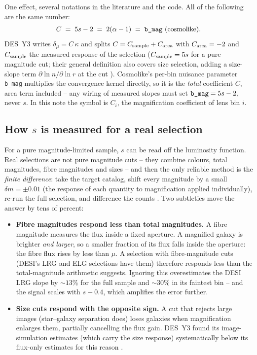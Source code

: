 \documentclass[11pt]{article}
\newcommand{\us}{\_\allowbreak}
\begin{document}
One effect, several notations in the literature and the code.  All of
the following are the same number:
\begin{equation}
  C \;=\; 5s - 2 \;=\; 2(\alpha - 1)
  \;=\; \texttt{b\us mag}\ \text{(cosmolike)} .
  \label{eq:conventions}
\end{equation}
DES~Y3 \cite{KrauseY3, ElvinPoole2022} writes
$\delta_\mu = C\,\kappa$ and splits $C = C_{\rm sample} + C_{\rm
area}$ with $C_{\rm area} = -2$ and $C_{\rm sample}$ the measured
response of the selection ($C_{\rm sample} = 5s$ for a pure magnitude
cut; their general definition also covers size selection, adding a
size-slope term $\partial\ln n/\partial\ln r$ at the cut
\cite{KrauseY3}).  Cosmolike's per-bin nuisance parameter
\texttt{b\us mag} multiplies the convergence kernel directly, so it
is the \emph{total} coefficient $C$, area term included -- any wiring
of measured slopes must set $\texttt{b\us mag} = 5s - 2$, never $s$.
In this note the symbol is $C_i$, the magnification coefficient of
lens bin $i$.

\subsection{How $s$ is measured for a real selection}
\label{sec:measure}

For a pure magnitude-limited sample, $s$ can be read off the
luminosity function.  Real selections are not pure magnitude cuts --
they combine colours, total magnitudes, fibre magnitudes and sizes --
and then the only reliable method is the \emph{finite difference}: take
the target catalog, shift every magnitude by a small
$\delta m = \pm 0.01$ (the response of each quantity to
magnification applied individually), re-run the full selection, and
difference the counts \cite{ElvinPoole2022, Zhou2023, Wenzl2023}.  Two
subtleties move the answer by tens of percent:

\begin{itemize}
\item \textbf{Fibre magnitudes respond less than total magnitudes.}
  A fibre magnitude measures the flux inside a fixed aperture.  A
  magnified galaxy is brighter \emph{and larger}, so a smaller
  fraction of its flux falls inside the aperture: the fibre flux
  rises by less than $\mu$.  A selection with fibre-magnitude cuts
  (DESI's LRG and ELG selections have them) therefore responds less
  than the total-magnitude arithmetic suggests.  Ignoring this
  overestimates the DESI LRG slope by ${\sim}13\%$ for the full
  sample and ${\sim}30\%$ in its faintest bin \cite{Zhou2023} -- and
  the signal scales with $s - 0.4$, which amplifies the error
  further.
\item \textbf{Size cuts respond with the opposite sign.}  A cut that
  rejects large images (star--galaxy separation does) loses galaxies
  when magnification enlarges them, partially cancelling the flux
  gain.  DES~Y3 found its image-simulation estimates (which carry
  the size response) systematically below its flux-only estimates for
  this reason \cite{ElvinPoole2022}.
\end{itemize}
\end{document}

